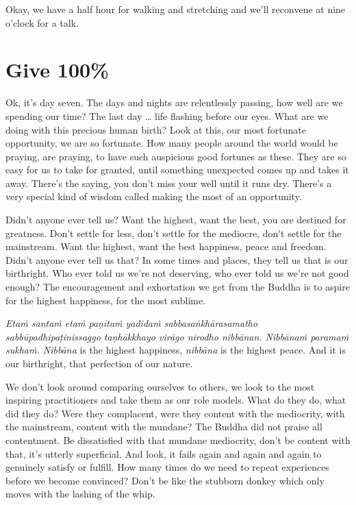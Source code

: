 \documentclass[12pt,openany]{book}
\begin{document}
Okay, we have a half hour for walking and stretching and we’ll reconvene at nine o'clock for a talk.

\chapter*{Give 100\%}

Ok, it's day seven. The days and nights are relentlessly passing, how well are we spending our time? The last day … life flashing before our eyes. What are we doing with this precious human birth? Look at this, our most fortunate opportunity, we are so fortunate. How many people around the world would be praying, are praying, to have such auspicious good fortunes as these. They are so easy for us to take for granted, until something unexpected comes up and takes it away. There’s the saying, you don't miss your well until it runs dry. There's a very special kind of wisdom called making the most of an opportunity. 

Didn't anyone ever tell us? Want the highest, want the best, you are destined for greatness. Don't settle for less, don't settle for the mediocre, don’t settle for the mainstream. Want the highest, want the best happiness, peace and freedom. Didn’t anyone ever tell us that? In some times and places, they tell us that is our birthright. Who ever told us we're not deserving, who ever told us we're not good enough? The encouragement and exhortation we get from the Buddha is to aspire for the highest happiness, for the most sublime.

\textit{Etaṁ santaṁ etaṁ paṇītaṁ yadidaṁ sabbasaṅkhārasamatho sabbūpadhipaṭinissaggo taṇhākkhayo virāgo nirodho nibbānan. Nibbānaṁ paramaṁ sukhaṁ. Nibbāna} is the highest happiness, \textit{nibbāna} is the highest peace. And it is our birthright, that perfection of our nature.

We don't look around comparing ourselves to others, we look to the most inspiring practitioners and take them as our role models. What do they do, what did they do? Were they complacent, were they content with the mediocrity, with the mainstream, content with the mundane? The Buddha did not praise all contentment. Be dissatisfied with that mundane mediocrity, don't be content with that, it’s utterly superficial. And look, it fails again and again and again to genuinely satisfy or fulfill. How many times do we need to repeat experiences before we become convinced? Don't be like the stubborn donkey which only moves with the lashing of the whip.
\end{document}
